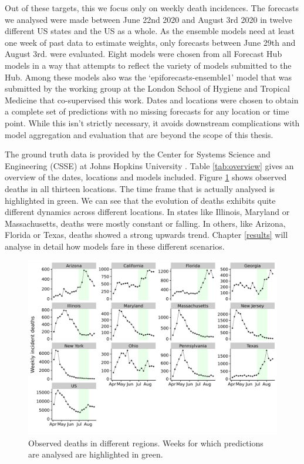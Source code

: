 \documentclass[
]{book}
\begin{document}
Out of these targets, this we focus only on weekly death incidences. The forecasts we analysed were made between June 22nd 2020 and August 3rd 2020 in twelve different US states and the US as a whole. As the ensemble models need at least one week of past data to estimate weights, only forecasts between June 29th and August 3rd. were evaluated. Eight models were chosen from all Forecast Hub models in a way that attempts to reflect the variety of models submitted to the Hub. Among these models also was the `epiforecasts-ensemble1' model that was submitted by the working group at the London School of Hygiene and Tropical Medicine that co-supervised this work. Dates and locations were chosen to obtain a complete set of predictions with no missing forecasts for any location or time point. While this isn't strictly necessary, it avoids downstream complications with model aggregation and evaluation that are beyond the scope of this thesis.

The ground truth data is provided by the Center for Systems Science and Engineering (CSSE) at Johns Hopkins University \citep{dongInteractiveWebbasedDashboard2020}. Table \ref{tab:overview} gives an overview of the dates, locations and models included. Figure \ref{fig:us-data} shows observed deaths in all thirteen locations. The time frame that is actually analysed is highlighted in green. We can see that the evolution of deaths exhibits quite different dynamics across different locations. In states like Illinois, Maryland or Massachusetts, deaths were mostly constant or falling. In others, like Arizona, Florida or Texas, deaths showed a strong upwards trend. Chapter \ref{results} will analyse in detail how models fare in these different scenarios.

\begin{figure}
\includegraphics[width=0.95\linewidth]{../visualisation/chapter-2-background-data/plot-observations} \caption{Observed deaths in different regions. Weeks for which predictions are analysed are highlighted in green.}\label{fig:us-data}
\end{figure}
\end{document}
